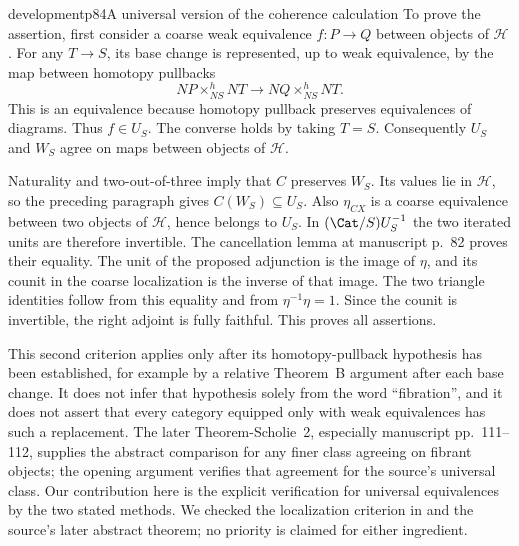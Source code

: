 \begin{dcomment}{development}{p84}{A universal version of the coherence calculation}
To prove the assertion, first consider a coarse weak equivalence $f:P\to Q$ between objects of $\mathcal H$. For any $T\to S$, its base change is represented, up to weak equivalence, by the map between homotopy pullbacks
\[
 NP\mathbin{\times^{h}_{NS}}NT
   \longrightarrow NQ\mathbin{\times^{h}_{NS}}NT.
\]
This is an equivalence because homotopy pullback preserves equivalences of diagrams. Thus $f\in U_S$. The converse holds by taking $T=S$. Consequently $U_S$ and $W_S$ agree on maps between objects of $\mathcal H$.

Naturality and two-out-of-three imply that $C$ preserves $W_S$. Its values lie in $\mathcal H$, so the preceding paragraph gives $C(W_S)\subseteq U_S$. Also $\eta_{CX}$ is a coarse equivalence between two objects of $\mathcal H$, hence belongs to $U_S$. In $(\Cat/S)U_S^{-1}$ the two iterated units are therefore invertible. The cancellation lemma at manuscript p.~82 proves their equality. The unit of the proposed adjunction is the image of $\eta$, and its counit in the coarse localization is the inverse of that image. The two triangle identities follow from this equality and from $\eta^{-1}\eta=1$. Since the counit is invertible, the right adjoint is fully faithful. This proves all assertions.

This second criterion applies only after its homotopy-pullback hypothesis has been established, for example by a relative Theorem~B argument after each base change. It does not infer that hypothesis solely from the word ``fibration'', and it does not assert that every category equipped only with weak equivalences has such a replacement. The later Theorem-Scholie~2, especially manuscript pp.~111--112, supplies the abstract comparison for any finer class agreeing on fibrant objects; the opening argument verifies that agreement for the source's universal class. Our contribution here is the explicit verification for universal equivalences by the two stated methods. We checked the localization criterion in \citet[Proposition~5.2.7.4]{Lurie2009HTT} and the source's later abstract theorem; no priority is claimed for either ingredient.
\end{dcomment}

